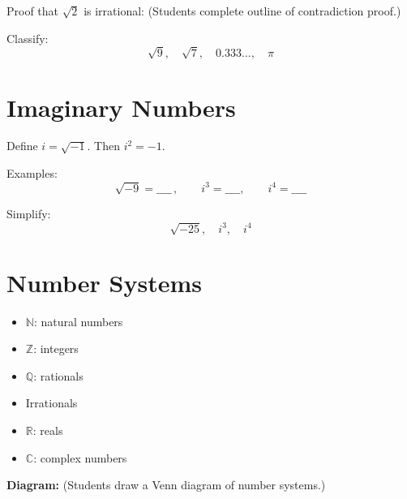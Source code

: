 \documentclass[12pt]{article}
\begin{document}
\begin{notebox}[Example]
Proof that $\sqrt{2}$ is irrational:  
(Students complete outline of contradiction proof.)
\end{notebox}

\begin{notebox}[Practice]
Classify:
\[
\sqrt{9}, \quad \sqrt{7}, \quad 0.333\ldots, \quad \pi
\]
\end{notebox}

\section{Imaginary Numbers}
\begin{notebox}[Definition]
Define $i = \sqrt{-1}$.  
Then $i^2 = -1$.
\end{notebox}

\noindent Examples:
\[
\sqrt{-9} = \_\_\_\_\,, \qquad i^3 = \_\_\_\_, \qquad i^4 = \_\_\_\_
\]

\begin{notebox}[Practice]
Simplify:
\[
\sqrt{-25}, \quad i^3, \quad i^4
\]
\end{notebox}

\section{Number Systems}
\begin{notebox}[Hierarchy]
\begin{multicols}{2}
\begin{itemize}[topsep=0pt]
  \item $\mathbb{N}$: natural numbers
  \item $\mathbb{Z}$: integers
  \item $\mathbb{Q}$: rationals
  \item Irrationals
  \item $\mathbb{R}$: reals
  \item $\mathbb{C}$: complex numbers
\end{itemize}
\end{multicols}
\end{notebox}

\vspace{1cm}
\noindent\textbf{Diagram:} (Students draw a Venn diagram of number systems.)
\end{document}
